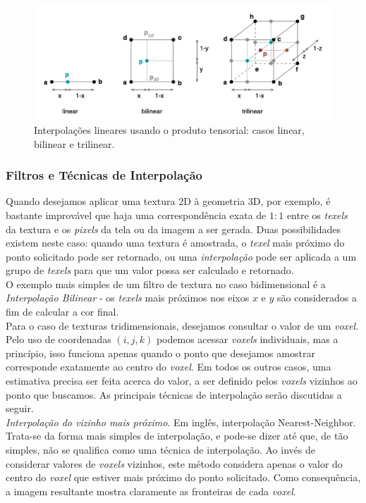 \documentclass[12pt, a4paper, oneside]{book}
\begin{document}
\begin{figure}[!htb]
\center
\includegraphics[width=15cm]{produtoTensorial}
\caption{Interpolações lineares usando o produto tensorial: casos linear, bilinear e trilinear.}
\label{produtoTensorial}
\end{figure}

\subsubsection{Filtros e Técnicas de Interpolação}

Quando desejamos aplicar uma textura 2D à geometria 3D, por exemplo, é bastante improvável que haja uma correspondência exata de $1:1$ entre os {\it texels} da textura e os {\it pixels} da tela ou da imagem a ser gerada. Duas possibilidades existem neste caso: quando uma textura é amostrada, o {\it texel} mais próximo do ponto solicitado pode ser retornado, ou uma \emph{interpolação} pode ser aplicada a um grupo de {\it texels} para que um valor possa ser calculado e retornado. \\

O exemplo mais simples de um filtro de textura no caso bidimensional é a \emph{Interpolação Bilinear} - os {\it texels} mais próximos nos eixos $x$ e $y$ são considerados a fim de calcular a cor final. \\

Para o caso de texturas tridimensionais, desejamos consultar o valor de um {\it voxel}. Pelo uso de coordenadas $(i, j, k)$ podemos acessar {\it voxels} individuais, mas a princípio, isso funciona apenas quando o ponto que desejamos amostrar corresponde exatamente ao centro do {\it voxel}. Em todos os outros casos, uma estimativa precisa ser feita acerca do valor, a ser definido pelos {\it voxels} vizinhos ao ponto que buscamos. As principais técnicas de interpolação serão discutidas a seguir. \\

\emph{Interpolação do vizinho mais próximo}. Em inglês, interpolação Nearest-Neighbor. Trata-se da forma mais simples de interpolação, e pode-se dizer até que, de tão simples, não se qualifica como uma técnica de interpolação. Ao invés de considerar valores de {\it voxels} vizinhos, este método considera apenas o valor do centro do {\it voxel} que estiver mais próximo do ponto solicitado. Como consequência, a imagem resultante mostra claramente as fronteiras de cada {\it voxel}. 
\end{document}
